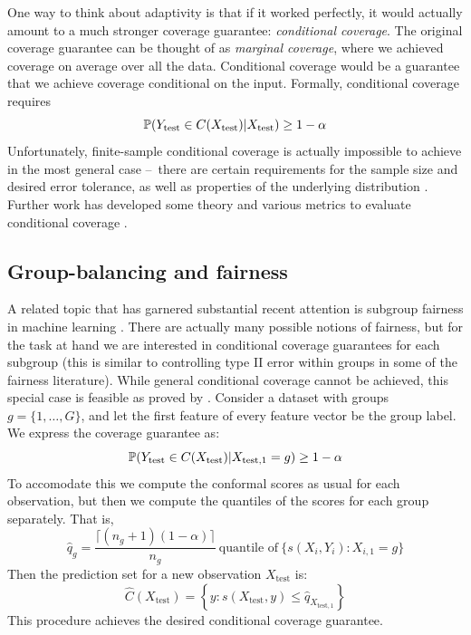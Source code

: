 \documentclass[a4paper, 12pt]{article}
\begin{document}
One way to think about adaptivity is that if it worked perfectly, it would actually amount to a much stronger coverage guarantee: \textit{conditional coverage}. The original coverage guarantee can be thought of as \textit{marginal coverage}, where we achieved coverage on average over all the data. Conditional coverage would be a guarantee that we achieve coverage conditional on the input. Formally, conditional coverage requires
\[ \P(Y_{\text{test}} \in C(X_{\text{test}}) | X_{\text{test}}) \geq 1 - \alpha \]
Unfortunately, finite-sample conditional coverage is actually impossible to achieve in the most general case --\ there are certain requirements for the sample size and desired error tolerance, as well as properties of the underlying distribution \cite{vovkConditionalValidityInductive2012,barberLimitsDistributionfreeConditional2021}. Further work has developed some theory and various metrics to evaluate conditional coverage \autocite{angelopoulosUncertaintySetsImage2022,cauchoisKnowingWhatYou2021,feldmanImprovingConditionalCoverage2021}.

\subsection{Group-balancing and fairness}
\label{sec:fairness}
A related topic that has garnered substantial recent attention is subgroup fairness in machine learning \autocite{dengFIFAMakingFairness2022,kearnsPreventingFairnessGerrymandering2018}. There are actually many possible notions of fairness, but for the task at hand we are interested in conditional coverage guarantees for each subgroup (this is similar to controlling type II error within groups in some of the fairness literature). While general conditional coverage cannot be achieved, this special case is feasible as proved by \textcite{vovkConditionalValidityInductive2012}. Consider a dataset with groups $g = \{ 1, \ldots, G \}$, and let the first feature of every feature vector be the group label. We express the coverage guarantee as:
\[ \P(Y_{\text{test}} \in C(X_{\text{test}}) | X_{\text{test},1} = g) \geq 1 - \alpha \]
To accomodate this we compute the conformal scores as usual for each observation, but then we compute the quantiles of the scores for each group separately. That is,
\[ \hat{q}_g = \frac{\lceil (n_g+1)(1-\alpha) \rceil }{n_g} ~\text{quantile of}~\{ s(X_i, Y_i) : X_{i,1} = g \} \]
Then the prediction set for a new observation $X_{\text{test}}$ is:
\[ \hat{C}(X_{\text{test}}) = \left\{ y: s(X_{\text{test}}, y) \leq \hat{q}_{X_{\text{test},1}} \right\} \]
This procedure achieves the desired conditional coverage guarantee.
\end{document}
